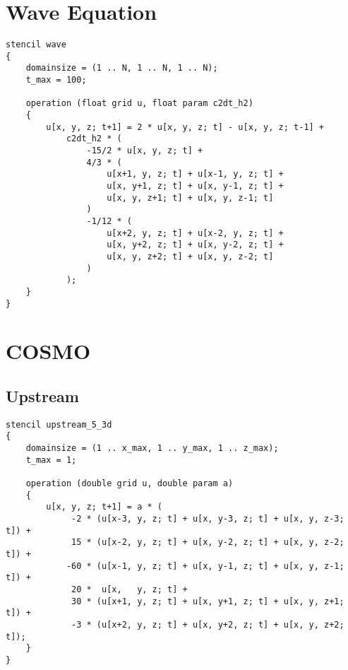 \section{Wave Equation}
\begin{lstlisting}[language=stencil]
stencil wave
{
    domainsize = (1 .. N, 1 .. N, 1 .. N);
    t_max = 100;

    operation (float grid u, float param c2dt_h2)
    {
        u[x, y, z; t+1] = 2 * u[x, y, z; t] - u[x, y, z; t-1] +
            c2dt_h2 * (
                -15/2 * u[x, y, z; t] +
                4/3 * (
                    u[x+1, y, z; t] + u[x-1, y, z; t] +
                    u[x, y+1, z; t] + u[x, y-1, z; t] +
                    u[x, y, z+1; t] + u[x, y, z-1; t]
                )
                -1/12 * (
                    u[x+2, y, z; t] + u[x-2, y, z; t] +
                    u[x, y+2, z; t] + u[x, y-2, z; t] +
                    u[x, y, z+2; t] + u[x, y, z-2; t]
                )
            );
    }
}
\end{lstlisting}


\section{COSMO}

\subsection{Upstream}
\begin{lstlisting}[language=stencil]
stencil upstream_5_3d
{
	domainsize = (1 .. x_max, 1 .. y_max, 1 .. z_max);
	t_max = 1;

	operation (double grid u, double param a)
	{
		u[x, y, z; t+1] = a * (
			 -2 * (u[x-3, y, z; t] + u[x, y-3, z; t] + u[x, y, z-3; t]) +
			 15 * (u[x-2, y, z; t] + u[x, y-2, z; t] + u[x, y, z-2; t]) +
			-60 * (u[x-1, y, z; t] + u[x, y-1, z; t] + u[x, y, z-1; t]) +
			 20 *  u[x,   y, z; t] +
			 30 * (u[x+1, y, z; t] + u[x, y+1, z; t] + u[x, y, z+1; t]) +
			 -3 * (u[x+2, y, z; t] + u[x, y+2, z; t] + u[x, y, z+2; t]);
	}
}
\end{lstlisting}

